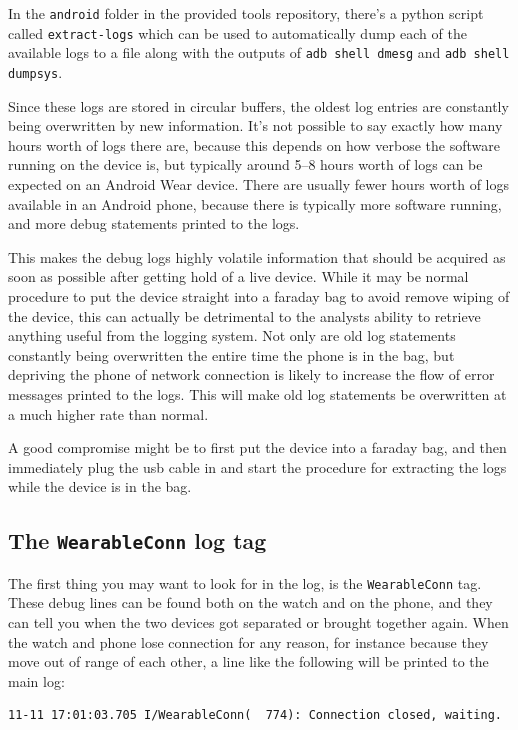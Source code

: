 \documentclass[a4paper,11pt,dvips]{article}
\begin{document}
In the \texttt{android} folder in the provided tools repository, there's a python script called \texttt{extract-logs} which can be used to automatically dump each of the available logs to a file along with the outputs of \texttt{adb shell dmesg} and \texttt{adb shell dumpsys}.

Since these logs are stored in circular buffers, the oldest log entries are constantly being overwritten by new information. It's not possible to say exactly how many hours worth of logs there are, because this depends on how verbose the software running on the device is, but typically around 5--8 hours worth of logs can be expected on an Android Wear device. There are usually fewer hours worth of logs available in an Android phone, because there is typically more software running, and more debug statements printed to the logs.

This makes the debug logs highly volatile information that should be acquired as soon as possible after getting hold of a live device. While it may be normal procedure to put the device straight into a faraday bag to avoid remove wiping of the device, this can actually be detrimental to the analysts ability to retrieve anything useful from the logging system. Not only are old log statements constantly being overwritten the entire time the phone is in the bag, but depriving the phone of network connection is likely to increase the flow of error messages printed to the logs. This will make old log statements be overwritten at a much higher rate than normal.

A good compromise might be to first put the device into a faraday bag, and then immediately plug the usb cable in and start the procedure for extracting the logs while the device is in the bag.


\subsection{The \texttt{WearableConn} log tag}

The first thing you may want to look for in the log, is the \texttt{WearableConn} tag. These debug lines can be found both on the watch and on the phone, and they can tell you when the two devices got separated or brought together again. When the watch and phone lose connection for any reason, for instance because they move out of range of each other, a line like the following will be printed to the main log:

\scriptsize
\begin{verbatim}
11-11 17:01:03.705 I/WearableConn(  774): Connection closed, waiting.
\end{verbatim}
\normalsize
\end{document}
